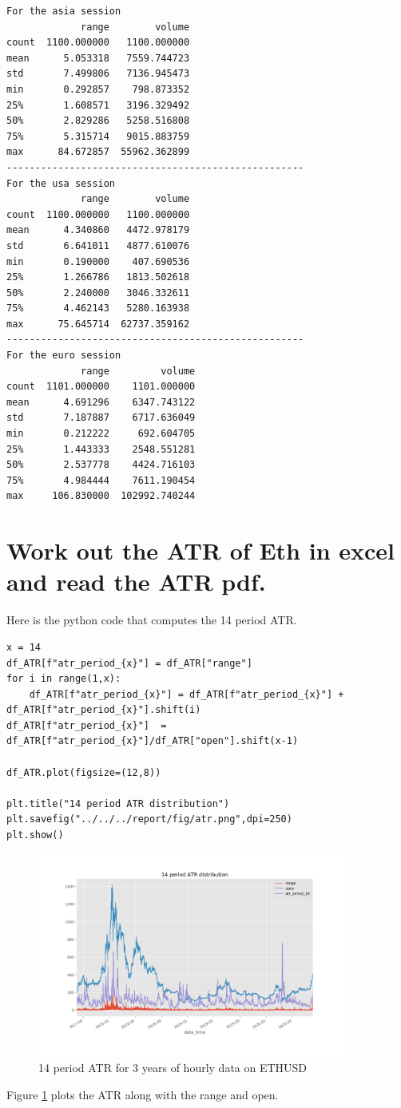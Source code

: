 \begin{verbatim}
For the asia session
             range        volume
count  1100.000000   1100.000000
mean      5.053318   7559.744723
std       7.499806   7136.945473
min       0.292857    798.873352
25%       1.608571   3196.329492
50%       2.829286   5258.516808
75%       5.315714   9015.883759
max      84.672857  55962.362899
----------------------------------------------------
For the usa session
             range        volume
count  1100.000000   1100.000000
mean      4.340860   4472.978179
std       6.641011   4877.610076
min       0.190000    407.690536
25%       1.266786   1813.502618
50%       2.240000   3046.332611
75%       4.462143   5280.163938
max      75.645714  62737.359162
----------------------------------------------------
For the euro session
             range         volume
count  1101.000000    1101.000000
mean      4.691296    6347.743122
std       7.187887    6717.636049
min       0.212222     692.604705
25%       1.443333    2548.551281
50%       2.537778    4424.716103
75%       4.984444    7611.190454
max     106.830000  102992.740244
\end{verbatim}

\section{ Work out the ATR of Eth in excel and read the ATR pdf.}
Here is the python code that computes the 14 period ATR. 
\begin{verbatim}
x = 14
df_ATR[f"atr_period_{x}"] = df_ATR["range"]
for i in range(1,x):
    df_ATR[f"atr_period_{x}"] = df_ATR[f"atr_period_{x}"] +  df_ATR[f"atr_period_{x}"].shift(i)
df_ATR[f"atr_period_{x}"]  = df_ATR[f"atr_period_{x}"]/df_ATR["open"].shift(x-1)

df_ATR.plot(figsize=(12,8))

plt.title("14 period ATR distribution")
plt.savefig("../../../report/fig/atr.png",dpi=250)
plt.show()
\end{verbatim}



\begin{figure}
\center
\includegraphics[width=0.9\textwidth]{fig/atr.png}
\caption{14 period ATR for 3 years of hourly data on ETHUSD}
\label{fig:atr}
\end{figure}
Figure \ref{fig:atr} plots the ATR along with the range and open.


